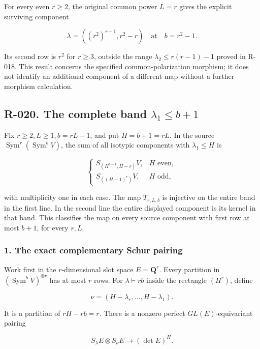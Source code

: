 \documentclass[
  10pt,
]{article}
\begin{document}
For every even \(r\ge2\), the original common power \(L=r\) gives the
explicit surviving component

\[
\lambda=((r^2)^{r-1},r^2-r)
\quad\text{at}\quad b=r^2-1.
\tag{N.10}
\]

Its second row is \(r^2\) for \(r\ge3\), outside the range
\(\lambda_2\le r(r-1)-1\) proved in R-018. This result concerns the
specified common-polarization morphism; it does not identify an
additional component of a different map without a further morphism
calculation.

\subsection{\texorpdfstring{R-020. The complete band
\(\lambda_1\le b+1\)}{R-020. The complete band \textbackslash lambda\_1\textbackslash le b+1}}\label{r-020.-the-complete-band-lambda_1le-b1}

Fix \(r\ge2,L\ge1,b=rL-1\), and put \(H=b+1=rL\). In the source
\(\operatorname{Sym}^r(\operatorname{Sym}^bV)\), the sum of all isotypic
components with \(\lambda_1\le H\) is

\[
\boxed{
\begin{cases}
S_{(H^{r-1},H-r)}V,&H\text{ even},\\
S_{((H-1)^r)}V,&H\text{ odd},
\end{cases}}
\tag{N.11}
\]

with multiplicity one in each case. The map \(T_{r,L,b}\) is injective
on the entire band in the first line. In the second line the entire
displayed component is its kernel in that band. This classifies the map
on every source component with first row at most \(b+1\), for every
\(r,L\).

\subsubsection{1. The exact complementary Schur
pairing}\label{the-exact-complementary-schur-pairing}

Work first in the \(r\)-dimensional slot space \(E=\mathbf Q^r\). Every
partition in \((\operatorname{Sym}^bV)^{\otimes r}\) has at most \(r\)
rows. For \(\lambda\vdash rb\) inside the rectangle \((H^r)\), define

\[
\nu=(H-\lambda_r,\ldots,H-\lambda_1).
\tag{N.12}
\]

It is a partition of \(rH-rb=r\). There is a nonzero perfect
\(GL(E)\)-equivariant pairing

\[
S_\lambda E\otimes S_\nu E\longrightarrow(\det E)^H.
\tag{N.13}
\]
\end{document}
